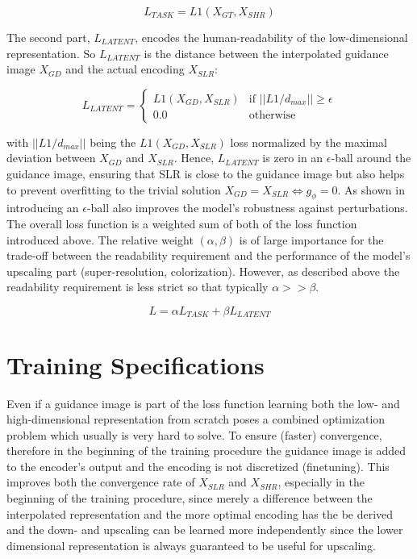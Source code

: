 $$L_{TASK} = L1(X_{GT}, X_{SHR})$$

The second part, $L_{LATENT}$, encodes the human-readability of the low-dimensional representation. So $L_{LATENT}$ is the distance between the interpolated guidance image $X_{GD}$ and the actual encoding $X_{SLR}$:

$$L_{LATENT} = \begin{cases}
L1(X_{GD}, X_{SLR}) & \text{if } ||L1/d_{max}|| \geq \epsilon
\\ 0.0 & \text{otherwise}
\end{cases}$$

with $||L1/d_{max}||$ being the $L1(X_{GD}, X_{SLR})$ loss normalized
by the maximal deviation between $X_{GD}$ and $X_{SLR}$. Hence, $L_{LATENT}$ is zero in an $\epsilon$-ball around the guidance image, ensuring that \ac{SLR} is close to the guidance image but also helps to prevent overfitting to the trivial solution $X_{GD} = X_{SLR} \Leftrightarrow g_\phi = 0$. As shown in  introducing an $\epsilon$-ball also improves the model's robustness against perturbations.
The overall loss function is a weighted sum of both of the loss function introduced above. The relative weight $(\alpha, \beta)$ is of large importance for the trade-off between the readability requirement and the performance of the model's upscaling part (super-resolution, colorization). However, as described above the readability requirement is less strict so that typically $\alpha >> \beta$.

$$L = \alpha L_{TASK} + \beta L_{LATENT}$$

\section{Training Specifications}
\label{sec:Approach_TS}
Even if a guidance image is part of the loss function learning both the low- and high-dimensional representation from scratch poses a combined optimization problem which usually is very hard to solve. To ensure (faster) convergence, therefore in the beginning of the training procedure the guidance image is added to the encoder's output and the encoding is not discretized (finetuning). This improves both the convergence rate of $X_{SLR}$ and $X_{SHR}$, especially in the beginning of the training procedure, since merely a difference between the interpolated representation and the more optimal encoding has the be derived and the down- and upscaling can be learned more independently since the lower dimensional representation is always guaranteed to be useful for upscaling.

